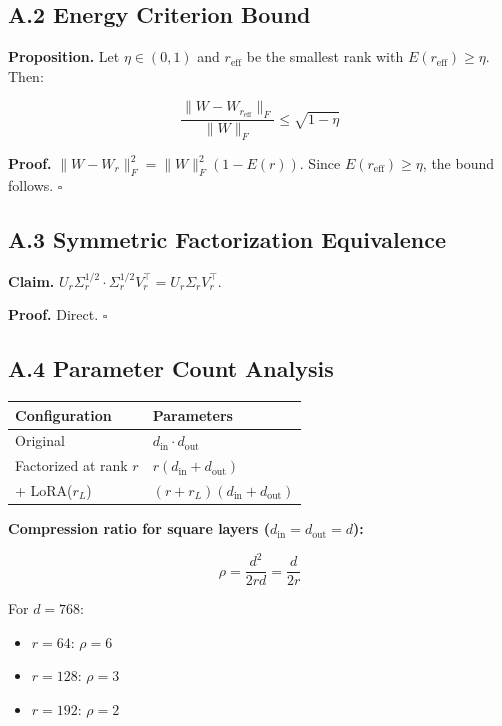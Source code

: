 \subsection{A.2 Energy Criterion Bound}

\textbf{Proposition.} Let $\eta \in (0, 1)$ and $r_\text{eff}$ be the smallest 
rank with $E(r_\text{eff}) \geq \eta$. Then:

\[
\frac{\|W - W_{r_\text{eff}}\|_F}{\|W\|_F} \leq \sqrt{1 - \eta}
\tag{A.2}
\]

\textbf{Proof.} $\|W - W_r\|_F^2 = \|W\|_F^2 (1 - E(r))$. Since $E(r_\text{eff}) \geq \eta$, 
the bound follows. $\square$

\subsection{A.3 Symmetric Factorization Equivalence}

\textbf{Claim.} $U_r \Sigma_r^{1/2} \cdot \Sigma_r^{1/2} V_r^\top = U_r \Sigma_r V_r^\top$.

\textbf{Proof.} Direct. $\square$

\subsection{A.4 Parameter Count Analysis}

\begin{table}[H]
\centering
\small
\begin{tabular}{ll}
\toprule
\textbf{Configuration} & \textbf{Parameters} \\
\midrule
Original & $d_\text{in} \cdot d_\text{out}$ \\
Factorized at rank $r$ & $r(d_\text{in} + d_\text{out})$ \\
+ LoRA($r_L$) & $(r + r_L)(d_\text{in} + d_\text{out})$ \\
\bottomrule
\end{tabular}
\end{table}

\textbf{Compression ratio for square layers ($d_\text{in} = d_\text{out} = d$):}

\[
\rho = \frac{d^2}{2rd} = \frac{d}{2r}
\tag{A.3}
\]

For $d = 768$:
\begin{itemize}
\item $r = 64$: $\rho = 6$
\item $r = 128$: $\rho = 3$
\item $r = 192$: $\rho = 2$

\end{itemize}

